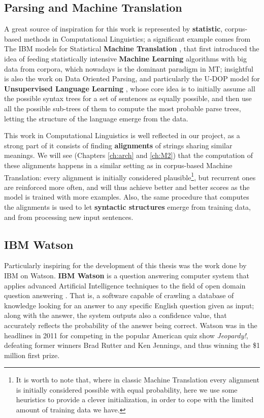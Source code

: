 \subsection{Parsing and Machine Translation}
A great source of inspiration for this work is represented by \textbf{statistic}, corpus-based methods in Computational Linguistics; a significant example comes from The IBM models for Statistical \textbf{Machine Translation} \citep{Brown:1993:MSM:972470.972474}, that first introduced the idea of feeding statistically intensive \textbf{Machine Learning} algorithms with big data from corpora, which nowadays is the dominant paradigm in MT; insightful is also the work on Data Oriented Parsing, and particularly the U-DOP model for \textbf{Unsupervised Language Learning} \citep{Bod:2006:UPU:1596276.1596293}, whose core idea is to initially assume all the possible syntax trees for a set of sentences as equally possible, and then use all the possible sub-trees of them to compute the most probable parse trees, letting the structure of the language emerge from the data.

This work in Computational Linguistics is well reflected in our project, as a strong part of it consists of finding \textbf{alignments} of strings sharing similar meanings. We will see (Chapters \ref{ch:arch} and \ref{ch:M2}) that the computation of these alignments happens in a similar setting as in corpus-based Machine Translation: every alignment is initially considered plausible\footnote{It is worth to note that, where in classic Machine Translation every alignment is initially considered possible with equal probability, here we use some heuristics to provide a clever initialization, in order to cope with the limited amount of training data we have.}, but recurrent ones are reinforced more often, and will thus achieve better and better scores as the model is trained with more examples. Also, the same procedure that computes the alignments is used to let \textbf{syntactic structures} emerge from training data, and from processing new input sentences.

\subsection{IBM Watson} \label{ch:rw:ml:watson}
Particularly inspiring for the development of this thesis was the work done by IBM on Watson. \textbf{IBM Watson} is a question answering computer system that applies advanced Artificial Intelligence techniques to the field of open domain question answering \citep{Ferrucci:2011:IW:2024723.2019525}. That is, a software capable of crawling a database of knowledge looking for an answer to any specific English question given as input; along with the answer, the system outputs also a confidence value, that accurately reflects the probability of the answer being correct. Watson was in the headlines in 2011 for competing in the popular American quiz show \textit{Jeopardy!}, defeating former winners  Brad Rutter and Ken Jennings, and thus winning the \$1 million first prize.

